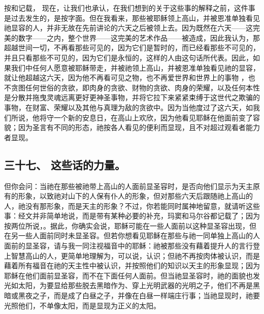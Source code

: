  按和记载， 现在，让我们也承认，在我们想到的关于这些事的解释之前，这件事是过去发生的，是按字面。但在我看来，那些被耶稣领上高山，并被恩准单独看见祂显容的人，并非无故在先前讲论的六天之后被领上去。因为既然在六天——这完美的数字——之内，整个世界——这完美的艺术作品——被造成，因此我认为，那超越世间一切，不再看那些可见的，因为它们是暂时的，而已经看那些不可见的，并且只看那些不可见的，因为它们是永恒的，这样的人由这句话所代表。因此，如果我们中任何人愿意被耶稣带走，并被祂领上高山，并被恩准单独看见祂的显容，就让他超越这六天，因为他不再看可见之物，也不再爱世界和世界上的事物 ，也不贪图任何世俗的贪欲，即肉身的贪欲、财物的贪欲、肉身的荣耀，以及任何本性是分散并拖曳灵魂远离更好更神圣事物，并将它拉下来紧紧束缚于这世代之欺骗的事物，在财富、荣耀以及其他与真理为敌的贪欲中。因为当他度过了这六天，如我们所说，他将守一个新的安息日，在高山上欢欣，因为他看见耶稣在他面前变了容貌；因为圣言有不同的形态，祂按各人看见的便利而显现，且不对超过观看者能力者显现。\par


\subsection{三十七、 这些话的力量。}

但你会问：当祂在那些被祂带上高山的人面前显圣容时，是否向他们显示为天主原有的形象，以致祂对山下的人保有仆人的形象，但对那些六天后跟随祂上高山的人，祂没有那形象，而是天主的形象？不过，你若能同时属神地留意，就请听这些事：经文并非简单地说，而是带有某种必要的补充，玛窦和马尔谷都记载了；因为按两位所说，。据此，你确实会说，耶稣可能在一些人面前以这种显圣容出现，但在另一些人面前同时未显圣容。但若你想看见耶稣在那些与祂一同单独上高山的人面前的显圣容，请与我一同注视福音中的耶稣：祂被那些没有藉着提升人的言行登上智慧高山的人，更简单地理解为，可以说，认识；但祂不再按肉体被认识，而是藉着所有福音在祂的天主性中被认识，并按照他们的知识以天主的形象显现；因为耶稣在他们面前显圣容，而不在下面任何人面前。但当祂显圣容时，祂的面貌也发光如太阳，为要显给那些脱去黑暗作为、穿上光明武器的光明之子，他们不再是黑暗或黑夜之子，而是成了白昼之子，并像在白昼一样端庄行事；当祂显现时，祂要光照他们，不单像太阳，而是显现为正义的太阳。\par

